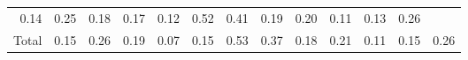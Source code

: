 \begin{table}[!h]
\begin{tabular}{lllllllllllll}
  \multicolumn{1}{|r}{0.14} &
  \multicolumn{1}{r}{0.25} &
  \multicolumn{1}{r}{0.18} &
  \multicolumn{1}{r}{0.17} &
  \multicolumn{1}{r}{0.12} &
  \multicolumn{1}{r}{0.52} &
  \multicolumn{1}{r}{0.41} &
  \multicolumn{1}{r}{0.19} &
  \multicolumn{1}{r}{0.20} &
  \multicolumn{1}{r}{0.11} &
  \multicolumn{1}{r}{0.13} &
  \multicolumn{1}{r}{0.26} \\
\multicolumn{1}{l}{\hspace{1em}Total} &
  \multicolumn{1}{|r}{0.15} &
  \multicolumn{1}{r}{0.26} &
  \multicolumn{1}{r}{0.19} &
  \multicolumn{1}{r}{0.07} &
  \multicolumn{1}{r}{0.15} &
  \multicolumn{1}{r}{0.53} &
  \multicolumn{1}{r}{0.37} &
  \multicolumn{1}{r}{0.18} &
  \multicolumn{1}{r}{0.21} &
  \multicolumn{1}{r}{0.11} &
  \multicolumn{1}{r}{0.15} &
  \multicolumn{1}{r}{0.26} \\
\cline{1-13}
\end{tabular}
\end{table}
